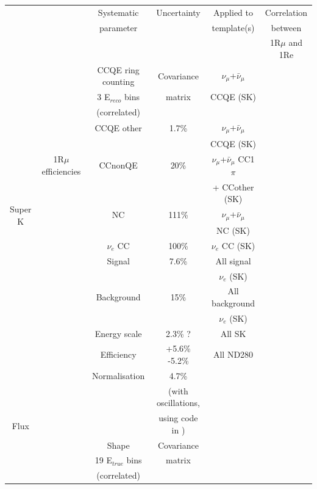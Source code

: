\begin{table}[h]
\centering
\begin{tabular}{|c|c|c|c|c|c|}
\hline
 & & Systematic & Uncertainty & Applied to & Correlation\\
 & & parameter & & template(s) & between  \\
 & &  &  &  & 1R$\mu$ and 1Re \\
\hline
\hline
\multirow{16}{*}{Super K}  & \multirow{11}{*}{1R$\mu$ efficiencies} & CCQE ring counting & Covariance & $\nu_{\mu}$+$\bar{\nu}_{\mu}$ & \\
 &  & 3 E$_{reco}$ bins & matrix \cite{TN065} & CCQE (SK) & \\
 & & (correlated) &  &  & \\
\cline{3-6}
 & & CCQE other & 1.7\% \cite{TN065} & $\nu_{\mu}$+$\bar{\nu}_{\mu}$ & \\
 & &  &  & CCQE (SK) & \\
\cline{3-6}
 & & CCnonQE & 20\% \cite{TN065} & $\nu_{\mu}$+$\bar{\nu}_{\mu}$ CC1$\pi$ & \\
 & &  &  & + CCother (SK) & \\
\cline{3-6}
 & & NC & 111\% \cite{TN065} & $\nu_{\mu}$+$\bar{\nu}_{\mu}$ & \\
 & & &  \cite{TN065} & NC (SK) & \\
\cline{3-6}
 & & $\nu_{e}$ CC & 100\% & $\nu_{e}$ CC (SK) & \\
\cline{2-6}
 & \multirow{4}{*}{1Re efficiencies}& Signal & 7.6\% \cite{NueRun1and2Analysis} & All signal  & \\
 &  &  &  & $\nu_{e}$ (SK)  & \\
\cline{3-6}
 & & Background & 15\% \cite{NueRun1and2Analysis} & All background & \\
 &  &  &  & $\nu_{e}$ (SK)  & \\
\cline{2-6}
 &  & Energy scale & {\color{red} 2.3\% \cite{TN065} ?} & All SK &  \\
\hline
 ND280 & & Efficiency & +5.6\% -5.2\% \cite{ND280Error} & All ND280 & \\
\hline
\multirow{6}{*}{Flux} & & Normalisation & 4.7\% & & \\
 & & & (with oscillations, & & \\
 & & & using code in \cite{FluxNormError}) & & \\
\cline{3-6}
 & & Shape & Covariance & & \\
 & & 19 E$_{true}$ bins & matrix \cite{FluxShapeError} &  & \\
 & & (correlated) &  &  & \\ 

\end{tabular}
\end{table}
